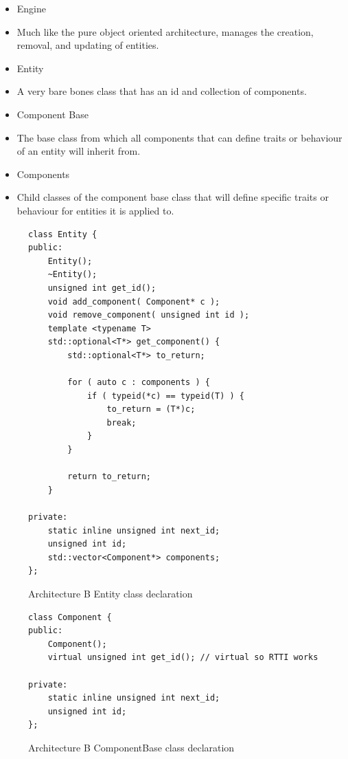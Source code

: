\documentclass{article}
\begin{document}
\begin{itemize}
    \item Engine
    \item[] Much like the pure object oriented architecture, manages the
            creation, removal, and updating of entities.

    \item Entity
    \item[] A very bare bones class that has an id and collection of components.

    \item Component Base
    \item[] The base class from which all components that can define traits or
            behaviour of an entity will inherit from.

    \item Components
    \item[] Child classes of the component base class that will define specific
            traits or behaviour for entities it is applied to.
\end{itemize}

\begin{figure}
\centering
\begin{BVerbatim}
class Entity {
public:
    Entity();
    ~Entity();
    unsigned int get_id();
    void add_component( Component* c );
    void remove_component( unsigned int id );
    template <typename T>
    std::optional<T*> get_component() {
        std::optional<T*> to_return;

        for ( auto c : components ) {
            if ( typeid(*c) == typeid(T) ) {
                to_return = (T*)c;
                break;
            }
        }

        return to_return;
    }

private:
    static inline unsigned int next_id;
    unsigned int id;
    std::vector<Component*> components;
};
\end{BVerbatim}
\caption{Architecture B Entity class declaration}
\label{arch_b_entity_header}
\end{figure}

\begin{figure}
\centering
\begin{BVerbatim}
class Component {
public:
    Component();
    virtual unsigned int get_id(); // virtual so RTTI works

private:
    static inline unsigned int next_id;
    unsigned int id;
};
\end{BVerbatim}
\caption{Architecture B ComponentBase class declaration}
\label{arch_b_component_base_header}
\end{figure}
\end{document}
